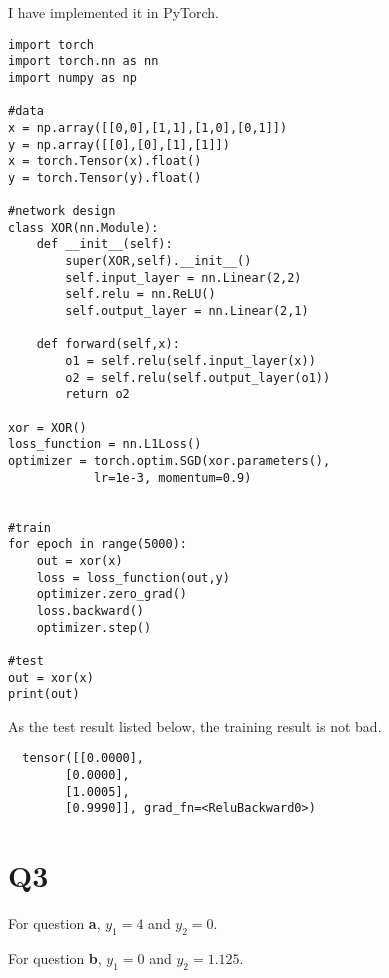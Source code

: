 \documentclass[a4paper]{article}
\begin{document}
I have implemented it in PyTorch.
\begin{lstlisting}
import torch
import torch.nn as nn
import numpy as np

#data
x = np.array([[0,0],[1,1],[1,0],[0,1]])
y = np.array([[0],[0],[1],[1]])
x = torch.Tensor(x).float()
y = torch.Tensor(y).float()

#network design
class XOR(nn.Module):
    def __init__(self):
        super(XOR,self).__init__()
        self.input_layer = nn.Linear(2,2)
        self.relu = nn.ReLU()
        self.output_layer = nn.Linear(2,1)

    def forward(self,x):
        o1 = self.relu(self.input_layer(x))
        o2 = self.relu(self.output_layer(o1))
        return o2

xor = XOR()
loss_function = nn.L1Loss()
optimizer = torch.optim.SGD(xor.parameters(), 
            lr=1e-3, momentum=0.9)


#train
for epoch in range(5000):
    out = xor(x)
    loss = loss_function(out,y)
    optimizer.zero_grad()
    loss.backward()
    optimizer.step()

#test
out = xor(x)
print(out)
  \end{lstlisting}
As the test result listed below, 
the training result is not bad.
\begin{lstlisting}
  tensor([[0.0000],
        [0.0000],
        [1.0005],
        [0.9990]], grad_fn=<ReluBackward0>)
\end{lstlisting}

\section{Q3}
For question \textbf{a}, $y_1 = 4$ and $y_2 = 0$.

For question \textbf{b}, $y_1 = 0$ and $y_2 = 1.125$.
\end{document}
